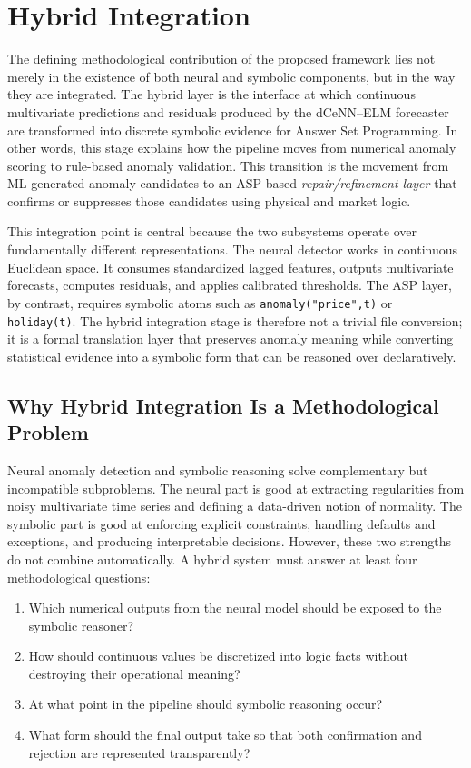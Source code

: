 \section{Hybrid Integration}
\label{sec:hybrid_integration}

The defining methodological contribution of the proposed framework lies not merely in the existence of both neural and symbolic components, but in the way they are integrated. The hybrid layer is the interface at which continuous multivariate predictions and residuals produced by the dCeNN--ELM forecaster are transformed into discrete symbolic evidence for Answer Set Programming. In other words, this stage explains how the pipeline moves from numerical anomaly scoring to rule-based anomaly validation. This transition is the movement from ML-generated anomaly candidates to an ASP-based \emph{repair/refinement layer} that confirms or suppresses those candidates using physical and market logic.

This integration point is central because the two subsystems operate over fundamentally different representations. The neural detector works in continuous Euclidean space. It consumes standardized lagged features, outputs multivariate forecasts, computes residuals, and applies calibrated thresholds. The ASP layer, by contrast, requires symbolic atoms such as \texttt{anomaly("price",t)} or \texttt{holiday(t)}. The hybrid integration stage is therefore not a trivial file conversion; it is a formal translation layer that preserves anomaly meaning while converting statistical evidence into a symbolic form that can be reasoned over declaratively.

\subsection{Why Hybrid Integration Is a Methodological Problem}

Neural anomaly detection and symbolic reasoning solve complementary but incompatible subproblems. The neural part is good at extracting regularities from noisy multivariate time series and defining a data-driven notion of normality. The symbolic part is good at enforcing explicit constraints, handling defaults and exceptions, and producing interpretable decisions. However, these two strengths do not combine automatically. A hybrid system must answer at least four methodological questions:
\begin{enumerate}
	\item Which numerical outputs from the neural model should be exposed to the symbolic reasoner?
	\item How should continuous values be discretized into logic facts without destroying their operational meaning?
	\item At what point in the pipeline should symbolic reasoning occur?
	\item What form should the final output take so that both confirmation and rejection are represented transparently?
\end{enumerate}


